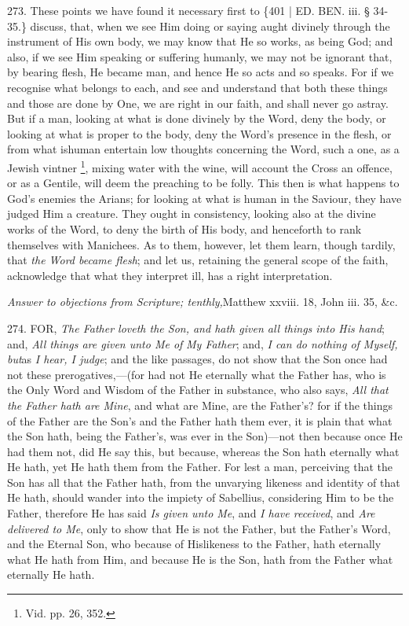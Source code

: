 273. These points we
have found it necessary first to \{401 | ED. BEN.
iii. § 34-35.\} discuss, that, when we see Him doing or saying aught
divinely through the instrument of His own body, we may know that He
so works, as being God; and also, if we see Him speaking or suffering
humanly, we may not be ignorant that, by bearing flesh, He became man,
and hence He so acts and so speaks. For if we recognise what belongs
to each, and see and understand that both these things and those are
done by One, we are right in our faith, and shall never go astray. But
if a man, looking at what is done divinely by the Word, deny the body,
or looking at what is proper to the body, deny the Word's presence in
the flesh, or from what is\emph{}human entertain low thoughts
concerning the Word, such a one, as a Jewish vintner \footnote{Vid. pp. 26, 352.}, mixing water with the wine, will account the Cross an offence,
or as a Gentile, will deem the preaching to be folly. This then is
what happens to God's enemies the Arians; for looking at what is human
in the Saviour, they have judged Him a creature. They ought in
consistency, looking also at the divine works of the Word, to deny the
birth of His body, and henceforth to rank themselves with Manichees.
As to them, however, let them learn, though tardily, that \emph{the Word
became flesh}; and let us, retaining the general scope of the
faith, acknowledge that what they interpret ill, has a right
interpretation.


\emph{Answer
to objections from Scripture; tenthly,}Matthew
xxviii. 18, John iii. 35, \&c.

274.
FOR,
\emph{The Father loveth the Son, and hath given all things into His hand};
and, \emph{All things are given unto Me of} \emph{My Father};
and, \emph{I can do nothing of Myself, but}as \emph{I hear, I judge};
and the like passages, do not show that the Son once had not these
prerogatives,—(for had not He eternally what the Father has, who is
the Only Word and Wisdom of the Father in substance, who also says, \emph{All
that the Father hath are Mine}, and what are Mine, are the Father's?
for if the things of the Father are the Son's and the Father hath them
ever, it is plain that what the Son hath, being the Father's, was ever
in the Son)—not then because once He had them not, did He say this,
but because, whereas the Son hath eternally what He hath, yet He hath
them from the Father. For lest a man, perceiving that the Son has all
that the Father hath, from the unvarying likeness and identity of that
He hath, should wander into the impiety of Sabellius, considering Him
to be the Father, therefore He has said \emph{Is given unto Me}, and \emph{I
have received}, and \emph{Are delivered to Me}, only to show that
He is not the Father, but the Father's Word, and the Eternal Son, who
because of His\emph{}likeness to the Father, hath eternally what He
hath from Him, and because He is the Son, hath from the Father what
eternally He hath.

